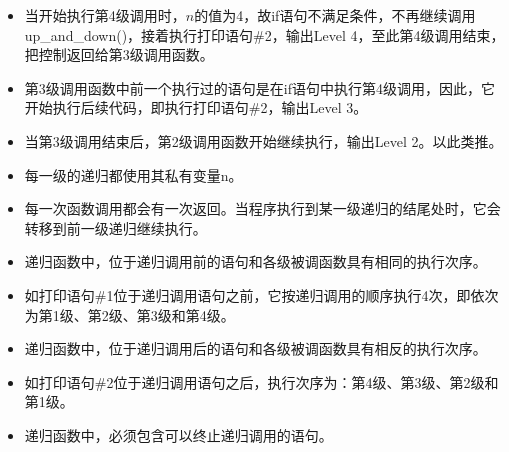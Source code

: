 \begin{frame}[fragile]
\begin{itemize}
\item 当开始执行第4级调用时，$n$的值为4，故if语句不满足条件，不再继续调用{\tf up\_and\_down()}，接着执行打印语句{\tf \#2}，输出{\tf Level 4}，至此第4级调用结束，把控制返回给第3级调用函数。\\[0.1in]
\item 第3级调用函数中前一个执行过的语句是在if语句中执行第4级调用，因此，它开始执行后续代码，即执行打印语句{\tf \#2}，输出{\tf Level 3}。\\[0.1in]
\item 当第3级调用结束后，第2级调用函数开始继续执行，输出{\tf Level 2}。以此类推。
\end{itemize}
\end{frame}

\begin{frame}[fragile]
\begin{itemize}
\item
\textcolor{acolor1}{每一级的递归都使用其私有变量n。}\\[0.1in]
\item
每一次函数调用都会有一次返回。当程序执行到某一级递归的结尾处时，它会转移到前一级递归继续执行。
\end{itemize}
\end{frame}

\begin{frame}[fragile]
\begin{itemize}
\item
递归函数中，位于递归调用前的语句和各级被调函数具有相同的执行次序。\\[0.1in]
\item[] 如打印语句\#1位于递归调用语句之前，它按递归调用的顺序执行4次，即依次为第1级、第2级、第3级和第4级。\\[0.1in]
\item 
递归函数中，位于递归调用后的语句和各级被调函数具有相反的执行次序。\\[0.1in]
\item[] 
如打印语句{\tf \#2}位于递归调用语句之后，执行次序为：第4级、第3级、第2级和第1级。
\end{itemize}
\end{frame}

\begin{frame}[fragile]
\begin{itemize}
\item 递归函数中，必须包含可以终止递归调用的语句。
\end{itemize}

\end{frame}


